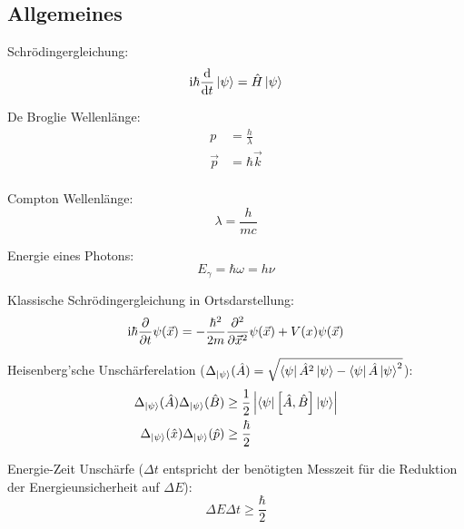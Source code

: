 \documentclass[11pt]{article}
\numberwithin{equation}{section}
\begin{document}
		\subsection{Allgemeines}
			\noindent
			Schrödingergleichung:
			\begin{equation}
				\mathrm{i}\hbar\frac{\mathrm{d} }{\mathrm{d} t}\Ket{\psi} = \hat{H}\Ket{\psi}
			\end{equation}

			\noindent
			De Broglie Wellenlänge:
			\begin{equation}
				\begin{aligned}
					p &= \frac{h}{\lambda} \\
					\vec{p} &= \hbar \vec{k} \\
				\end{aligned}
			\end{equation}

			\noindent
			Compton Wellenlänge:
			\begin{equation}
				\lambda = \frac{h}{mc}
			\end{equation}

			\noindent
			Energie eines Photons:
			\begin{equation}
				E_\gamma = \hbar\omega = h\nu
			\end{equation}

			\noindent
			Klassische Schrödingergleichung in Ortsdarstellung:
			\begin{equation}
				\mathrm{i}\hbar\frac{\partial }{\partial t}\psi(\vec{x}) = -\frac{\hbar^2}{2m}\frac{\partial^2}{\partial \vec{x}^2}\psi(\vec{x}) + V(x)\psi(\vec{x})
			\end{equation}

			\noindent
			Heisenberg'sche Unschärferelation ($\Delta_{\Ket{\psi}} (\hat{A}) = \sqrt{\Bra{\psi}\hat{A}^2\Ket{\psi} - \Bra{\psi}\hat{A}\Ket{\psi}^2}$):
			\begin{equation}
				\begin{aligned}
					\Delta_{\Ket{\psi}}(\hat{A}) \Delta_{\Ket{\psi}}(\hat{B}) &\ge
					\frac{1}{2} \left|\Bra{\psi} \left[\hat{A},\hat{B}\right] \Ket{\psi}\right| \\
					\Delta_{\Ket{\psi}}(\hat{x}) \Delta_{\Ket{\psi}}(\hat{p}) &\ge
					\frac{\hbar}{2}
				\end{aligned}
			\end{equation}

			\noindent
			Energie-Zeit Unschärfe ($\Delta t$ entspricht der benötigten Messzeit für die Reduktion der Energieunsicherheit auf $\Delta E$):
			\begin{equation}
				\Delta E \Delta t \ge \frac{\hbar}{2}
			\end{equation}
\end{document}
